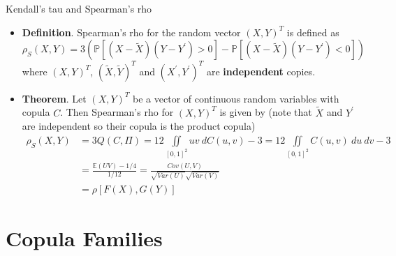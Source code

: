 \documentclass[11pt]{beamer}
\theoremstyle{plain}
\theoremstyle{definition}
\theoremstyle{remark}
\begin{document}
\begin{frame}{Kendall's tau and Spearman's rho}
\footnotesize{
\begin{itemize}
	\item
		\textbf{Definition}.  Spearman's rho for the random vector  $(X, Y)^T$ is defined as
		\begin{equation}
		\rho_S (X, Y) =3 (\mathbb{P}[(X-\tilde X)(Y-Y^\prime) > 0]-\mathbb{P}[(X-\tilde X)(Y-Y^\prime ) < 0]) 
		\end{equation}
		where $(X, Y)^T$, $(\tilde X, \tilde Y)^T$ and $(X^\prime, Y^\prime)^T$ are \textbf{independent} copies.
	\item
		\noindent\textbf{Theorem}.  Let $(X, Y)^T$ be a vector of continuous random variables with copula $C$. Then Spearman's rho 
		for $(X, Y)^T$ is given by (note that $\tilde X$ and $Y^\prime$ are independent so their copula is the product copula)
		\begin{equation}
		\begin{split}
		\rho_S (X, Y) & = 3Q(C, \Pi) = 12 \iint\limits_{[0, 1]^2} uv \> dC(u, v) - 3 = 12 \iint\limits_{[0, 1]^2} C(u,v) \>du\>dv - 3 \\
		& = \frac{\mathbb{E}(UV) - 1/4}{1/12} = \frac{Cov(U, V)}{\sqrt{Var(U)}\sqrt{Var(V)}} \\
		& = \rho[F(X), G(Y)]
		\end{split}
		\end{equation}
\end{itemize}
}
\end{frame}
\section{Copula Families}
\end{document}
